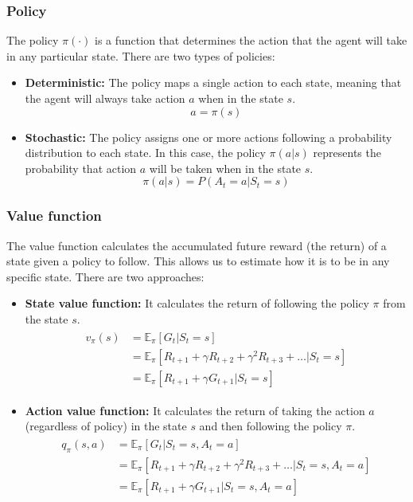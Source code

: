 \subsubsection*{Policy}

The policy $\pi(\cdot)$ is a function that determines the action that the agent will take in any particular state. There are two types of policies:

\begin{itemize}
    \item \textbf{Deterministic:} The policy maps a single action to each state, meaning that the agent will always take action $a$ when in the state $s$.
    \begin{equation}
        a = \pi(s)
    \end{equation}
    \item \textbf{Stochastic:} The policy assigns one or more actions following a probability distribution to each state. In this case, the policy $\pi(a|s)$ represents the probability that action $a$ will be taken when in the state $s$.
    \begin{equation}
        \pi(a|s) = P(A_t=a|S_t=s)
    \end{equation}
\end{itemize}

\subsubsection*{Value function}

The value function calculates the accumulated future reward (the return) of a state given a policy to follow. This allows us to estimate how  it is to be in any specific state. There are two approaches:

\begin{itemize}
    \item \textbf{State value function:} It calculates the return of following the policy $\pi$ from the state $s$.
    \begin{align}
    \begin{split}
        v_\pi(s) &= \mathbb{E}_\pi[G_t|S_t = s]\\
        &= \mathbb{E}_\pi[R_{t+1} + \gamma R_{t+2} + \gamma^2R_{t+3} + \ldots|S_t = s]\\
        &= \mathbb{E}_\pi[R_{t+1} + \gamma G_{t+1}|S_t = s]
    \end{split}
    \end{align}
    \item \textbf{Action value function:} It calculates the return of taking the action $a$ (regardless of policy) in the state $s$ and then following the policy $\pi$.
    \begin{align}
    \begin{split}
        q_\pi(s,a) &= \mathbb{E}_\pi[G_t |S_t = s,A_t = a]\\
        &= \mathbb{E}_\pi[R_{t+1} + \gamma R_{t+2} + \gamma^2R_{t+3} + \ldots|S_t = s,A_t = a]\\
        &= \mathbb{E}_\pi[R_{t+1} + \gamma G_{t+1}|S_t = s,A_t = a]
    \end{split}
    \end{align}
\end{itemize}

